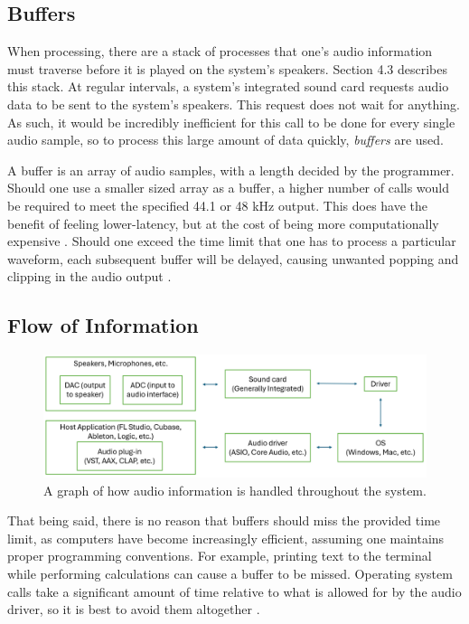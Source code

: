 \documentclass[12pt]{article}
\begin{document}
\subsection{Buffers}
When processing, there are a stack of processes that one's audio information must traverse before it is played on the system's speakers. Section 4.3 describes this stack. At regular intervals, a system's integrated sound card requests audio data to be sent to the system's speakers. This request does not wait for anything. \cite{Doumler} As such, it would be incredibly inefficient for this call to be done for every single audio sample, so to process this large amount of data quickly, \textit{buffers} are used. 

A buffer is an array of audio samples, with a length decided by the programmer. Should one use a smaller sized array as a buffer, a higher number of calls would be required to meet the specified 44.1 or 48 kHz output. This does have the benefit of feeling lower-latency, but at the cost of being more computationally expensive \cite{Doumler}. Should one exceed the time limit that one has to process a particular waveform, each subsequent buffer will be delayed, causing unwanted popping and clipping in the audio output \cite{Goodlife}.  

\subsection{Flow of Information}

\begin{center}
	\begin{figure}[h]
		\includegraphics[scale=0.4]{image1.png}
		\caption{A graph of how audio information is handled throughout the system.}
	\end{figure}
\end{center}

That being said, there is no reason that buffers should miss the provided time limit, as computers have become increasingly efficient, assuming one maintains proper programming conventions. For example, printing text to the terminal while performing calculations can cause a buffer to be missed. Operating system calls take a significant amount of time relative to what is allowed for by the audio driver, so it is best to avoid them altogether \cite{Doumler}.
\end{document}
